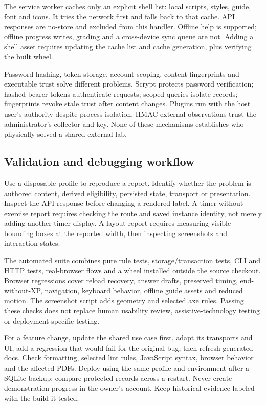 The service worker caches only an explicit shell list: local scripts, styles, guide,
font and icons. It tries the network first and falls back to that cache. API responses
are no-store and excluded from this handler. Offline help is supported; offline
progress writes, grading and a cross-device sync queue are not. Adding a shell asset
requires updating the cache list and cache generation, plus verifying the built wheel.

Password hashing, token storage, account scoping, content fingerprints and executable
trust solve different problems. Scrypt protects password verification; hashed bearer
tokens authenticate requests; scoped queries isolate records; fingerprints revoke
stale trust after content changes. Plugins run with the host user's authority despite
process isolation. HMAC external observations trust the administrator's collector and
key. None of these mechanisms establishes who physically solved a shared external lab.

\subsection{Validation and debugging workflow}
Use a disposable profile to reproduce a report. Identify whether the problem is
authored content, derived eligibility, persisted state, transport or presentation.
Inspect the API response before changing a rendered label. A timer-without-exercise
report requires checking the route and saved instance identity, not merely adding
another timer display. A layout report requires measuring visible bounding boxes
at the reported width, then inspecting screenshots and interaction states.

The automated suite combines pure rule tests, storage/transaction tests, CLI and HTTP
tests, real-browser flows and a wheel installed outside the source checkout. Browser
regressions cover reload recovery, answer drafts, preserved timing, end-without-XP,
navigation, keyboard behavior, offline guide assets and reduced motion. The screenshot
script adds geometry and selected axe rules. Passing these checks does not replace
human usability review, assistive-technology testing or deployment-specific testing.

For a feature change, update the shared use case first, adapt its transports and UI,
add a regression that would fail for the original bug, then refresh generated docs.
Check formatting, selected lint rules, JavaScript syntax, browser behavior and the
affected PDFs. Deploy using the same profile and environment after a SQLite backup;
compare protected records across a restart. Never create demonstration progress in
the owner's account. Keep historical evidence labeled with the build it tested.

